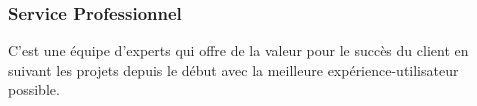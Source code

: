 \subsubsection{Service Professionnel}
C'est une équipe d'experts qui offre de la valeur pour le succès du client en suivant les projets depuis le début avec la meilleure expérience-utilisateur possible.
